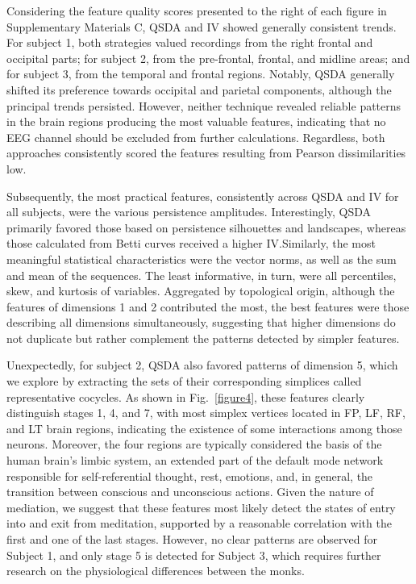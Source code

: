 \documentclass[pdflatex,sn-basic,Numbered]{sn-jnl}
\begin{document}
Considering the feature quality scores presented to the right of each figure in Supplementary Materials C, QSDA and IV showed generally consistent trends. For subject 1, both strategies valued recordings from the right frontal and occipital parts; for subject 2, from the pre-frontal, frontal, and midline areas; and for subject 3, from the temporal and frontal regions. Notably, QSDA generally shifted its preference towards occipital and parietal components, although the principal trends persisted. However, neither technique revealed reliable patterns in the brain regions producing the most valuable features, indicating that no EEG channel should be excluded from further calculations. Regardless, both approaches consistently scored the features resulting from Pearson dissimilarities low.
 
Subsequently, the most practical features, consistently across QSDA and IV for all subjects, were the various persistence amplitudes. Interestingly, QSDA primarily favored those based on persistence silhouettes and landscapes, whereas those calculated from Betti curves received a higher IV.\@ Similarly, the most meaningful statistical characteristics were the vector norms, as well as the sum and mean of the sequences. The least informative, in turn, were all percentiles, skew, and kurtosis of variables. Aggregated by topological origin, although the features of dimensions 1 and 2 contributed the most, the best features were those describing all dimensions simultaneously, suggesting that higher dimensions do not duplicate but rather complement the patterns detected by simpler features.

Unexpectedly, for subject 2, QSDA also favored patterns of dimension 5, which we explore by extracting the sets of their corresponding simplices called representative cocycles. As shown in Fig.~\ref{figure4}, these features clearly distinguish stages 1, 4, and 7, with most simplex vertices located in FP, LF, RF, and LT brain regions, indicating the existence of some interactions among those neurons. Moreover, the four regions are typically considered the basis of the human brain's limbic system, an extended part of the default mode network responsible for self-referential thought, rest, emotions, and, in general, the transition between conscious and unconscious actions. Given the nature of mediation, we suggest that these features most likely detect the states of entry into and exit from meditation, supported by a reasonable correlation with the first and one of the last stages. However, no clear patterns are observed for Subject 1, and only stage 5 is detected for Subject 3, which requires further research on the physiological differences between the monks.
\end{document}

